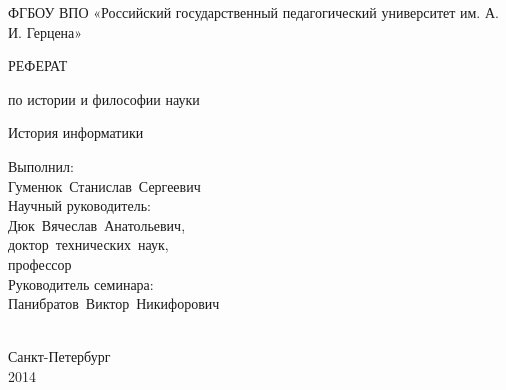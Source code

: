 \thispagestyle{empty}

\begin{center}
ФГБОУ ВПО «Российский государственный педагогический университет
им. А. И. Герцена» \par 
\par
\end{center}



\vspace{50mm}

\begin{center}
РЕФЕРАТ 

по истории и философии науки 

История информатики 

\end{center}

\vspace{20mm}
\begin{flushright}
\begin{minipage}
{0.4\textwidth} 
Выполнил:\\
Гуменюк~Станислав~Сергеевич\\ 

Научный руководитель: \\
Дюк~Вячеслав~Анатольевич,\\
доктор~технических~наук,\\
профессор\\

Руководитель семинара: \\
Панибратов~Виктор~Никифорович\\
\\[0.3cm] 
\end{minipage}

\end{flushright}

\vfill
\begin{center}
{Санкт-Петербург \\ 2014}
\end{center}

\newpage